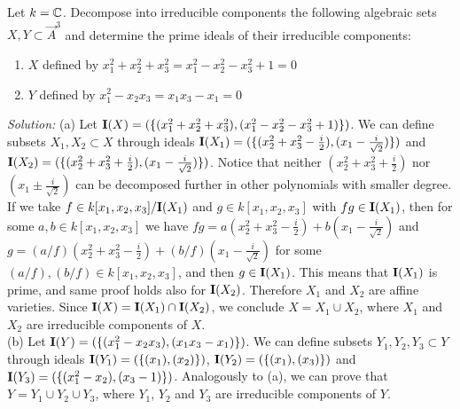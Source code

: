 \documentclass[../main/main.tex]{subfiles}
\begin{document}
\begin{ex}
Let $k=\mathbb C$. Decompose into irreducible components the following algebraic sets $X,Y\subset\vec A^3$ and determine the prime ideals of their irreducible components:
\begin{enumerate}[label=(\alph*)]
\item $X$ defined by $x_1^2+x_2^2+x_3^2=x_1^2-x_2^2-x_3^2+1=0$
\item $Y$ defined by $x_1^2-x_2x_3=x_1x_3-x_1=0$
\end{enumerate}
%
\textit{Solution:}
%
(a) Let $\mathbf I(X)=(\{(x_1^2+x_2^2+x_3^2),(x_1^2-x_2^2-x_3^2+1)\})$. We can define subsets $X_1,X_2\subset X$ through ideals $\mathbf I(X_1)=(\{(x_2^2+x_3^2-\frac i2),(x_1-\frac i{\sqrt2})\})$ and $\mathbf I(X_2)=(\{(x_2^2+x_3^2+\frac i2),(x_1-\frac i{\sqrt2})\})$. Notice that neither $(x_2^2+x_3^2+\frac i2)$ nor $(x_1\pm\frac i{\sqrt2})$ can be decomposed further in other polynomials with smaller degree. If we take $f\in k[x_1,x_2,x_3]/\mathbf I(X_1)$ and $g\in k[x_1,x_2,x_3]$ with $f g\in \mathbf I(X_1)$, then for some $a,b\in k[x_1,x_2,x_3]$ we have $fg=a(x_2^2+x_3^2-\frac i2)+b(x_1-\frac i{\sqrt2})$ and $g=(a/f)(x_2^2+x_3^2-\frac i2)+(b/f)(x_1-\frac i{\sqrt2})$ for some $(a/f),(b/f)\in k[x_1,x_2,x_3]$, and then $g\in  \mathbf I(X_1)$. This means that  $\mathbf I(X_1)$ is prime, and same proof holds also for $ \mathbf I(X_2)$. Therefore $X_1$ and $X_2$ are affine varieties. Since $\mathbf I(X)=\mathbf I(X_1)\cap\mathbf I(X_2)$, we conclude $X=X_1\cup X_2$, where $X_1$ and $X_2$ are irreducible components of $X$.\\
(b) Let $\mathbf I(Y)=(\{(x_1^2-x_2x_3),(x_1x_3-x_1)\})$. We can define subsets $Y_1,Y_2,Y_3\subset Y$ through ideals $\mathbf I(Y_1)=(\{(x_1),(x_2)\})$, $\mathbf I(Y_2)=(\{(x_1),(x_3)\})$ and $\mathbf I(Y_3)=(\{(x_1^2-x_2),(x_3-1)\})$. Analogously to (a), we can prove that $Y=Y_1\cup Y_2\cup Y_3$, where $Y_1$, $Y_2$ and $Y_3$ are irreducible components of $Y$.\\

\end{ex}
\end{document}
